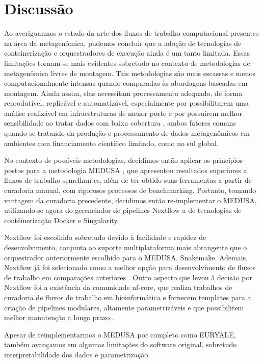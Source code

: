 \documentclass[
	12pt,				%
	oneside,			%
	a4paper,			%
	chapter=TITLE,		%
	section=TITLE,		%
	english,			%
	brazil				%
	]{abntex2}
\begin{document}
\chapter{Discussão}\label{discussuxe3o}

Ao averiguarmos o estado da arte dos fluxos de trabalho computacional presentes na área da metagenômica, pudemos concluir que a adoção de tecnologias de conteinerização e orquestradores de execução ainda é um tanto limitada. Essas limitações tornam-se mais evidentes sobretudo no contexto de metodologias de metagenômica livres de montagem. Tais metodologias são mais escassas e menos computacionalmente intensas quando comparadas às abordagens baseadas em montagem. Ainda assim, elas necessitam processamento adequado, de forma reprodutível, replicável e automatizável, especialmente por possibilitarem uma análise realizável em infraestruturas de menor porte e por possuírem melhor sensibilidade ao tratar dados com baixa cobertura \autocite{ayling2020}, ambos fatores comuns quando se tratando da produção e processamento de dados metagenômicos em ambientes com financiamento científico limitado, como no sul global.

No contexto de possíveis metodologias, decidimos então aplicar os princípios postos para a metodologia MEDUSA \autocite{morais2022}, que apresentou resultados superiores a fluxos de trabalho semelhantes, além de ter obtido suas ferramentas a partir de curadoria manual, com rigorosos processos de benchmarking. Portanto, tomando vantagem da curadoria precedente, decidimos então re-implementar o MEDUSA, utilizando-se agora do gerenciador de pipelines Nextflow a de tecnologias de contêinerização Docker e Singularity.

Nextflow foi escolhido sobretudo devido à facilidade e rapidez de desenvolvimento, conjunta ao suporte multiplataforma mais abrangente que o orquestrador anteriormente escolhido para o MEDUSA, Snakemake. Ademais, Nextflow já foi selecionado como a melhor opção para desenvolvimento de fluxos de trabalho em comparações anteriores \autocite{jackson2021} \autocite{celebi2023}. Outro aspecto que levou à decisão por Nextflow foi a existência da comunidade nf-core, que realiza trabalhos de curadoria de fluxos de trabalho em bioinformática e fornecem templates para a criação de pipelines modulares, altamente parametrizáveis e que possibilitem melhor manutenção a longo prazo \autocite{ewels2020}.

Apesar de reimplementarmos o MEDUSA por completo como EURYALE, também avançamos em algumas limitações do software original, sobretudo interpretabilidade dos dados e parametrização.
\end{document}
